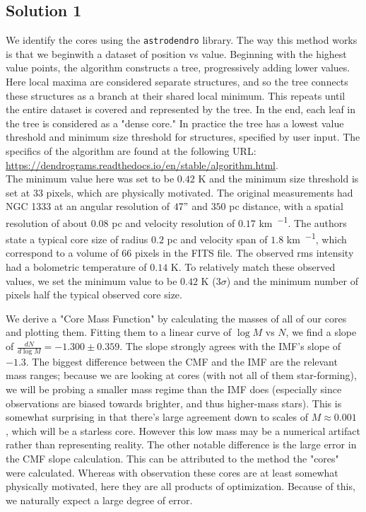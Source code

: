 \documentclass[11pt]{article}
\newenvironment{tight_enumerate}{
    \begin{enumerate}[label=(\alph*)]
    \setlength{\itemsep}{3pt}
    \setlength{\parskip}{0pt}}
    {\end{enumerate}}
\begin{document}
\subsection*{Solution 1}
\begin{tight_enumerate}
\item We identify the cores using the \texttt{astrodendro} library. The way this method works is that we beginwith a dataset of position vs value. Beginning with the highest value points, the algorithm constructs a tree, progressively adding lower values. Here local maxima are considered separate structures, and so the tree connects these structures as a branch at their shared local minimum. This repeats until the entire dataset is covered and represented by the tree. In the end, each leaf in the tree is considered as a "dense core." In practice the tree has a lowest value threshold and minimum size threshold for structures, specified by user input. The specifics of the algorithm are found at the following URL: \url{https://dendrograms.readthedocs.io/en/stable/algorithm.html}.\\
\indent\hspace{1em} The minimum value here was set to be $0.42$ \si{\kelvin} and the minimum size threshold is set at $33$ pixels, which are physically motivated. The original measurements had NGC 1333 at an angular resolution of $47"$ and $350$ \si{pc} distance, with a spatial resolution of about $0.08$ \si{pc} and velocity resolution of $0.17$ \si{\kilo\meter\per\sec}. The authors state a typical core size of radius $0.2$ \si{pc} and velocity span of $1.8$ \si{\kilo\meter\per\sec}, which correspond to a volume of $66$ pixels in the FITS file. The observed rms intensity had a bolometric temperature of $0.14$ \si{K}. To relatively match these observed values, we set the minimum value to be $0.42$ \si{K} ($3\sigma$) and the minimum number of pixels half the typical observed core size.

\item We derive a "Core Mass Function" by calculating the masses of all of our cores and plotting them. Fitting them to a linear curve of $\log{M}$ vs $N$, we find a slope of $\frac{dN}{d\log{M}} = -1.300\pm0.359$. The slope strongly agrees with the IMF's slope of $-1.3$. The biggest difference between the CMF and the IMF are the relevant mass ranges; because we are looking at cores (with not all of them star-forming), we will be probing a smaller mass regime than the IMF does (especially since observations are biased towards brighter, and thus higher-mass stars). This is somewhat surprising in that there's large agreement down to scales of $M \approx 0.001$ \si{\msun}, which will be a starless core. However this low mass may be a numerical artifact rather than representing reality. The other notable difference is the large error in the CMF slope calculation. This can be attributed to the method the "cores" were calculated. Whereas with observation these cores are at least somewhat physically motivated, here they are all products of optimization. Because of this, we naturally expect a large degree of error.


\end{tight_enumerate}
\end{document}

